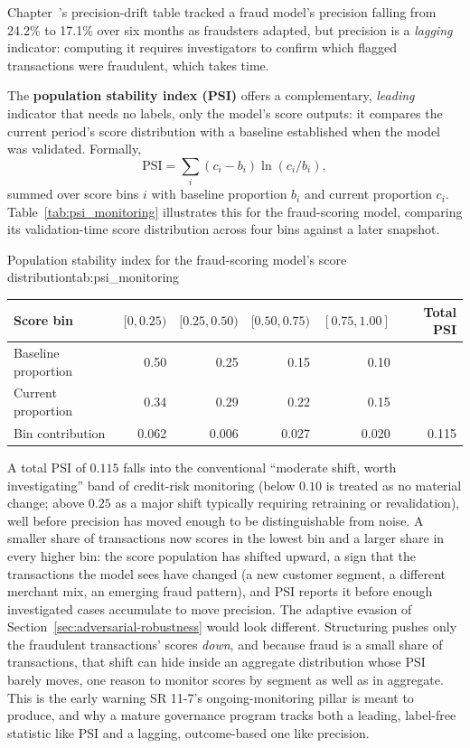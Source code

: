 \documentclass[../ai_in_finance]{subfiles}
\begin{document}
Chapter~'s precision-drift table tracked a fraud model's precision falling from 24.2\% to 17.1\% over six months as fraudsters adapted, but precision is a \emph{lagging} indicator: computing it requires investigators to confirm which flagged transactions were fraudulent, which takes time.

The \textbf{population stability index (PSI)} offers a complementary, \emph{leading} indicator that needs no labels, only the model's score outputs: it compares the current period's score distribution with a baseline established when the model was validated. Formally,
\begin{equation}
\text{PSI} = \sum_{i} (c_i - b_i) \ln(c_i / b_i),
\label{eq:xai-psi}
\end{equation}
summed over score bins $i$ with baseline proportion $b_i$ and current proportion $c_i$. Table~\ref{tab:psi_monitoring} illustrates this for the fraud-scoring model, comparing its validation-time score distribution across four bins against a later snapshot.

\begin{booktable}[htbp]{Population stability index for the fraud-scoring model's score distribution}{tab:psi_monitoring}
\begin{tabular}{lrrrrr}
\toprule
Score bin & $[0, 0.25)$ & $[0.25, 0.50)$ & $[0.50, 0.75)$ & $[0.75, 1.00]$ & Total PSI \\
\midrule
Baseline proportion & 0.50 & 0.25 & 0.15 & 0.10 & \\
Current proportion & 0.34 & 0.29 & 0.22 & 0.15 & \\
Bin contribution & 0.062 & 0.006 & 0.027 & 0.020 & 0.115 \\
\bottomrule
\end{tabular}
\end{booktable}

A total PSI of $0.115$ falls into the conventional ``moderate shift, worth investigating'' band of credit-risk monitoring (below $0.10$ is treated as no material change; above $0.25$ as a major shift typically requiring retraining or revalidation), well before precision has moved enough to be distinguishable from noise. A smaller share of transactions now scores in the lowest bin and a larger share in every higher bin: the score population has shifted upward, a sign that the transactions the model sees have changed (a new customer segment, a different merchant mix, an emerging fraud pattern), and PSI reports it before enough investigated cases accumulate to move precision. The adaptive evasion of Section~\ref{sec:adversarial-robustness} would look different. Structuring pushes only the fraudulent transactions' scores \emph{down}, and because fraud is a small share of transactions, that shift can hide inside an aggregate distribution whose PSI barely moves, one reason to monitor scores by segment as well as in aggregate. This is the early warning SR 11-7's ongoing-monitoring pillar is meant to produce, and why a mature governance program tracks both a leading, label-free statistic like PSI and a lagging, outcome-based one like precision.
\end{document}
